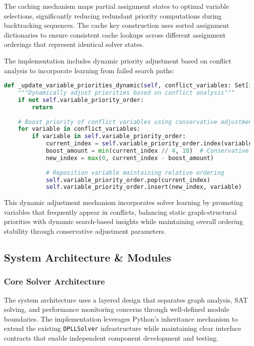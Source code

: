 The caching mechanism maps partial assignment states to optimal variable selections, significantly reducing redundant priority computations during backtracking sequences. The cache key construction uses sorted assignment dictionaries to ensure consistent cache lookups across different assignment orderings that represent identical solver states.

The implementation includes dynamic priority adjustment based on conflict analysis to incorporate learning from failed search paths:

\begin{lstlisting}[language=Python, caption=Dynamic Priority Adjustment]
def _update_variable_priorities_dynamic(self, conflict_variables: Set[int]) -> None:
    """Dynamically adjust priorities based on conflict analysis"""
    if not self.variable_priority_order:
        return
    
    # Boost priority of conflict variables using conservative adjustment
    for variable in conflict_variables:
        if variable in self.variable_priority_order:
            current_index = self.variable_priority_order.index(variable)
            boost_amount = min(current_index // 4, 10)  # Conservative boosting
            new_index = max(0, current_index - boost_amount)
            
            # Reposition variable maintaining relative ordering
            self.variable_priority_order.pop(current_index)
            self.variable_priority_order.insert(new_index, variable)
\end{lstlisting}

This dynamic adjustment mechanism incorporates solver learning by promoting variables that frequently appear in conflicts, balancing static graph-structural priorities with dynamic search-based insights while maintaining overall ordering stability through conservative adjustment parameters.

\subsection{System Architecture \& Modules}

\subsubsection{Core Solver Architecture}

The system architecture uses a layered design that separates graph analysis, SAT solving, and performance monitoring concerns through well-defined module boundaries. The implementation leverages Python's inheritance mechanism to extend the existing \texttt{DPLLSolver} infrastructure while maintaining clear interface contracts that enable independent component development and testing.

